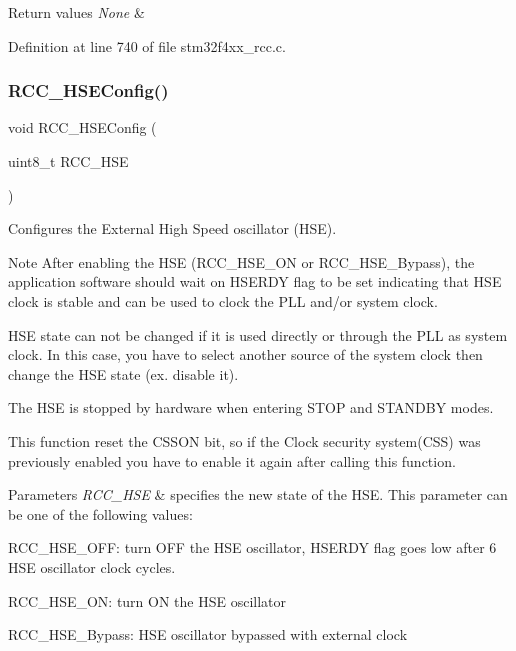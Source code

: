 \begin{DoxyRetVals}{Return values}
{\em None} & \\
\hline
\end{DoxyRetVals}


Definition at line 740 of file stm32f4xx\+\_\+rcc.\+c.

\mbox{\label{group___r_c_c_ga523b06e73f6aa8a03e42299c855066a8}} 
\subsubsection{\texorpdfstring{R\+C\+C\+\_\+\+H\+S\+E\+Config()}{RCC\_HSEConfig()}}
{\footnotesize\ttfamily void R\+C\+C\+\_\+\+H\+S\+E\+Config (\begin{DoxyParamCaption}\item[{uint8\+\_\+t}]{R\+C\+C\+\_\+\+H\+SE }\end{DoxyParamCaption})}



Configures the External High Speed oscillator (H\+SE). 

\begin{DoxyNote}{Note}
After enabling the H\+SE (R\+C\+C\+\_\+\+H\+S\+E\+\_\+\+ON or R\+C\+C\+\_\+\+H\+S\+E\+\_\+\+Bypass), the application software should wait on H\+S\+E\+R\+DY flag to be set indicating that H\+SE clock is stable and can be used to clock the P\+LL and/or system clock. 

H\+SE state can not be changed if it is used directly or through the P\+LL as system clock. In this case, you have to select another source of the system clock then change the H\+SE state (ex. disable it). 

The H\+SE is stopped by hardware when entering S\+T\+OP and S\+T\+A\+N\+D\+BY modes. 

This function reset the C\+S\+S\+ON bit, so if the Clock security system(\+C\+S\+S) was previously enabled you have to enable it again after calling this function. 
\end{DoxyNote}

\begin{DoxyParams}{Parameters}
{\em R\+C\+C\+\_\+\+H\+SE} & specifies the new state of the H\+SE. This parameter can be one of the following values\+: \begin{DoxyItemize}
\item R\+C\+C\+\_\+\+H\+S\+E\+\_\+\+O\+FF\+: turn O\+FF the H\+SE oscillator, H\+S\+E\+R\+DY flag goes low after 6 H\+SE oscillator clock cycles. \item R\+C\+C\+\_\+\+H\+S\+E\+\_\+\+ON\+: turn ON the H\+SE oscillator \item R\+C\+C\+\_\+\+H\+S\+E\+\_\+\+Bypass\+: H\+SE oscillator bypassed with external clock \end{DoxyItemize}
\\
\hline
\end{DoxyParams}

